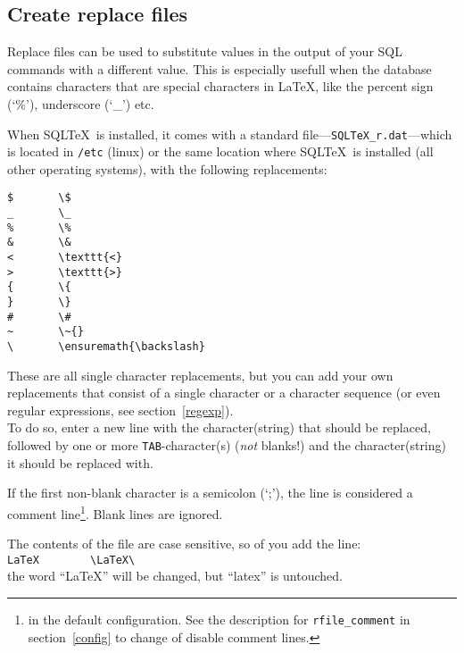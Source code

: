 \documentclass{article}
\begin{document}
\subsection{Create replace files}\label{replfiles}

Replace files can be used to substitute values in the output of your SQL commands with a different value. This is especially usefull when the database
contains characters that are special characters in \LaTeX, like the percent sign (`\%'), underscore (`\_') etc.

When SQL\TeX\ is installed, it comes with a standard file---\texttt{SQLTeX\_r.dat}---which is located in \texttt{/etc} (linux) or the same location where
SQL\TeX\ is installed (all other operating systems), with the following replacements:

\vspace{3mm}

\noindent\begin{verbatim}
$       \$
_       \_
%       \%
&       \&
<       \texttt{<}
>       \texttt{>}
{       \{
}       \}
#       \#
~       \~{}
\       \ensuremath{\backslash}
\end{verbatim}

\vspace{3mm}

These are all single character replacements, but you can add your own replacements that consist of a single character or a character sequence (or even regular expressions, see section~\ref{regexp}).\\
To do so, enter a new line with the character(string) that should be replaced, followed by one or more \texttt{TAB}-character(s) (\textit{not} blanks!) and the character(string) it should be replaced with.

If the first non-blank character is a semicolon (`;'), the line is considered a comment line\footnote{ in the default configuration. See the description for \texttt{rfile\_comment} in section~\ref{config} to change of disable comment lines.}. Blank lines are ignored.

\vspace{3mm}

The contents of the file are case sensitive, so of you add the line: \\
\verb+LaTeX        \LaTeX\+ \\
the word ``LaTeX'' will be changed, but ``latex'' is untouched.

\vspace{3mm}
\end{document}
